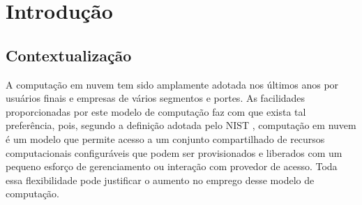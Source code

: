 \chapter{\label{chap:intro}Introdução}





%
%
%
%

\section{Contextualização}

A computação em nuvem tem sido amplamente adotada nos últimos anos por usuários finais e empresas de vários segmentos e portes.
As facilidades proporcionadas por este modelo de computação faz com que exista tal preferência, pois, segundo a definição adotada
pelo NIST \cite{Mell:2011}, computação em nuvem é um modelo que permite acesso a um conjunto compartilhado de recursos computacionais configuráveis que podem ser provisionados e liberados  com um pequeno esforço de gerenciamento ou interação com provedor de acesso.
Toda essa flexibilidade pode justificar o aumento no emprego desse modelo de computação.

